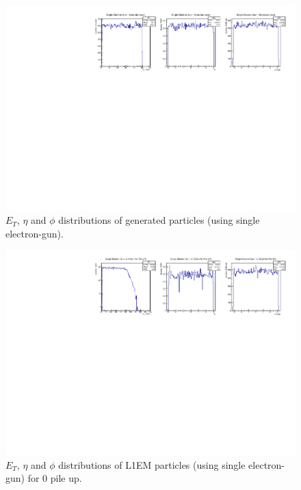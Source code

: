 \begin{figure}[!htb]
  \centering
  \includegraphics[scale=0.8]{../SimulationTools/GenParticles_EtEtaPhi.pdf}
  \caption{$E_{T}$, $\eta$ and $\phi$ distributions of generated particles (using single electron-gun).}
  \label{fig:GenParticles_EtEtaPhi}
\end{figure}

\begin{figure}[!htb]
  \centering
  \includegraphics[scale=0.8]{../SimulationTools/L1EM_EtEtaPhi_0PileUP.pdf}
  \caption{$E_{T}$, $\eta$ and $\phi$ distributions of L1EM particles (using single electron-gun) for 0 pile up.}
  \label{fig:L1EM_EtEtaPhi_0PileUP}
\end{figure}


